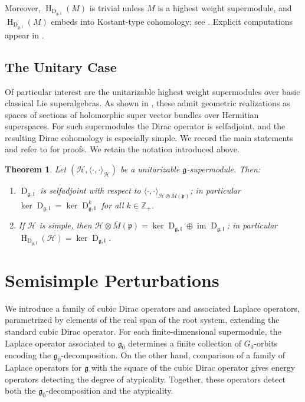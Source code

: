 \documentclass[11pt]{amsart}
\newcommand{\bracket}{{\langle \cdot,\cdot \rangle}}
\newcommand{\HH}{{\mathbb H}}
\renewcommand{\Im}{\operatorname{im}}
\newcommand{\Dirac}{\operatorname{D}}
\def\HH{{\mathcal{H}}}
\def\pp{{\mathfrak p}}
\def\H{{\operatorname{H}}}
\def\ll{{\mathfrak l}}
\def\even{{\mathfrak{g}_{\bar{0}}}}
\def\pp{{\mathfrak p}}
\def\pp{{\mathfrak{p}}}
\def\gg{{\mathfrak{g}}}
\def\ZZ{{\mathbb Z}}
\theoremstyle{plain}
\newtheorem{theorem}{Theorem}
\theoremstyle{remark}
\theoremstyle{definition}
\numberwithin{equation}{section}
\theoremstyle{remark}
\begin{document}
Moreover, $\H_{\Dirac_{\gg,\ll}}(M)$ is trivial unless $M$ is a highest weight supermodule, and $\H_{\Dirac_{\gg,\ll}}(M)$ embeds into Kostant-type cohomology;
see \cite{Schmidt_Noja}. Explicit computations appear in \cite{SchmidtDirac,Schmidt_Noja}.

\subsection{The Unitary Case}
Of particular interest are the unitarizable highest weight supermodules over basic classical Lie superalgebras. As shown in
\cite{Carmeli_Fioresi_Varadarajan_HW}, these admit geometric realizations as spaces of sections of holomorphic super vector bundles
over Hermitian superspaces. For such supermodules the Dirac operator is selfadjoint, and the resulting Dirac cohomology is
especially simple. We record the main statements and refer to \cite[Section~5]{Schmidt_Noja} for proofs. We retain the notation introduced above.

\begin{theorem}\label{thm::Dirac_unitarizable}
Let $(\HH,\bracket_{\HH})$ be a unitarizable $\gg$-supermodule. Then:
\begin{enumerate}
\item[a)] $\Dirac_{\gg,\ll}$ is selfadjoint with respect to $\bracket_{\HH\otimes \overline{M}(\pp)}$; in particular $\ker\Dirac_{\gg,\ll}=\ker\Dirac_{\gg,\ll}^{k}$ for all $k\in\ZZ_{+}$.
\item[b)] If $\HH$ is simple, then $\HH\otimes \overline{M}(\pp)=\ker\Dirac_{\gg,\ll}\oplus \Im\Dirac_{\gg,\ll}$; in particular $\H_{\Dirac_{\gg,\ll}}(\HH)=\ker\Dirac_{\gg,\ll}$.
\end{enumerate}
\end{theorem}



\section{Semisimple Perturbations}\label{sec::semisimple_perturbations} \noindent We introduce a family of cubic Dirac operators and associated Laplace operators, parametrized by elements of the real span of the root system, extending the standard cubic Dirac operator. For each finite-dimensional supermodule, the Laplace operator associated to $\even$ determines a finite collection of $G_{\bar0}$-orbits encoding the $\even$-decomposition. On the other hand, comparison of a family of Laplace operators for $\gg$ with the square of the cubic Dirac operator gives energy operators detecting the degree of atypicality. Together, these operators detect both the $\even$-decomposition and the atypicality.
\end{document}
